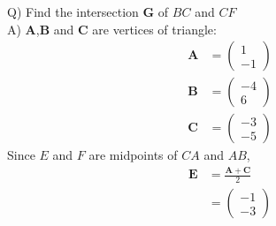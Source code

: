 \documentclass[journal,12pt,twocolumn]{IEEEtran}
\theoremstyle{remark}
\newcommand{\myvec}[1]{\begin{pmatrix}#1\end{pmatrix}}
\let\vec\mathbf
\begin{document}
\maketitle
\newpage
\bigskip
\renewcommand{\thefigure}{\theenumi}
\renewcommand{\thetable}{\theenumi}
%
Q) Find the intersection $\vec{G}$ of $BC$ and $CF$\\
A) $\vec{A}$,$\vec{B}$ and $\vec{C}$ are vertices of triangle:
\begin{align}
    \vec{A} &= \myvec{1 \\-1} \\
    \vec{B} &= \myvec{-4 \\ 6} \\
    \vec{C} &= \myvec{-3 \\-5}
\end{align}
Since $E$ and $F$ are midpoints of $CA$ and $AB$,
\begin{align}
    \vec{E} &= \frac{\vec{A} + \vec{C}}{2} \\
&= \myvec{-1 \\-3}
\end{align}\\
\end{document}
